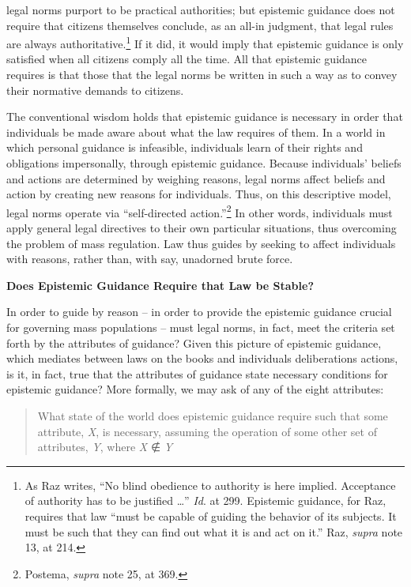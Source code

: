 legal norms purport to be practical authorities; but epistemic guidance
does not require that citizens themselves conclude, as an all-in
judgment, that legal rules are always authoritative.\footnote{As Raz
  writes, ``No blind obedience to authority is here implied. Acceptance
  of authority has to be justified \ldots{}'' \emph{Id}. at 299.
  Epistemic guidance, for Raz, requires that law ``must be capable of
  guiding the behavior of its subjects. It must be such that they can
  find out what it is and act on it.'' Raz, \emph{supra} note 13, at
  214.} If it did, it would imply that epistemic guidance is only
satisfied when all citizens comply all the time. All that epistemic
guidance requires is that those that the legal norms be written in such
a way as to convey their normative demands to citizens.

The conventional wisdom holds that epistemic guidance is necessary in
order that individuals be made aware about what the law requires of
them. In a world in which personal guidance is infeasible, individuals
learn of their rights and obligations impersonally, through epistemic
guidance. Because individuals' beliefs and actions are determined by
weighing reasons, legal norms affect beliefs and action by creating new
reasons for individuals. Thus, on this descriptive model, legal norms
operate via ``self-directed action.''\footnote{Postema, \emph{supra}
  note 25, at 369.} In other words, individuals must apply general legal
directives to their own particular situations, thus overcoming the
problem of mass regulation. Law thus guides by seeking to affect
individuals with reasons, rather than, with say, unadorned brute force.

\textbf{Does Epistemic Guidance Require that Law be Stable?}

In order to guide by reason -- in order to provide the epistemic
guidance crucial for governing mass populations -- must legal norms, in
fact, meet the criteria set forth by the attributes of guidance? Given
this picture of epistemic guidance, which mediates between laws on the
books and individuals deliberations actions, is it, in fact, true that
the attributes of guidance state necessary conditions for epistemic
guidance? More formally, we may ask of any of the eight attributes:

\begin{quote}
What state of the world does epistemic guidance require such that some
attribute, \emph{X}, is necessary, assuming the operation of some other
set of attributes, \emph{Y}, where \emph{X} ∉ \emph{Y }
\end{quote}

